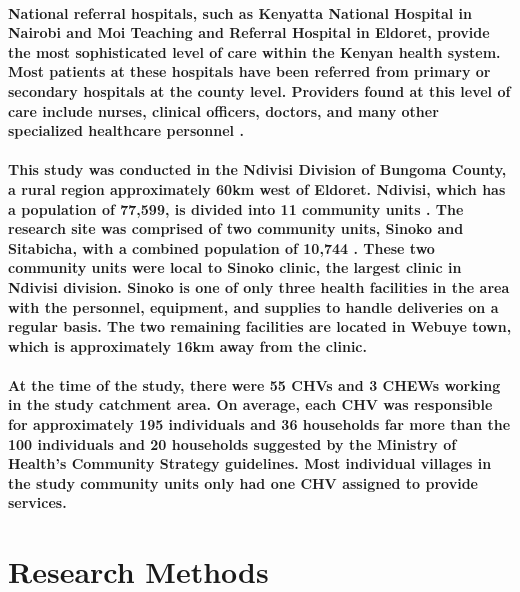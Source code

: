 \paragraph{National referral hospitals, such as Kenyatta National Hospital in Nairobi and Moi Teaching and Referral Hospital in Eldoret, provide the most sophisticated level of care within the Kenyan health system. Most patients at these hospitals have been referred from primary or secondary hospitals at the county level. Providers found at this level of care include nurses, clinical officers, doctors, and many other specialized healthcare personnel \citep{SPA2010}.}

\paragraph{This study was conducted in the Ndivisi Division of Bungoma County, a rural region approximately 60km west of Eldoret. Ndivisi, which has a population of 77,599, is divided into 11 community units \citep{Census2009}. The research site was comprised of two community units, Sinoko and Sitabicha, with a combined population of 10,744 \citep{Census2009}. These two community units were local to Sinoko clinic, the largest clinic in Ndivisi division. Sinoko is one of only three health facilities in the area with the personnel, equipment, and supplies to handle deliveries on a regular basis. The two remaining facilities are located in Webuye town, which is approximately 16km away from the clinic.}

\paragraph{At the time of the study, there were 55 CHVs and 3 CHEWs working in the study catchment area. On average, each CHV was responsible for approximately 195 individuals and 36 households \textemdash   far more than the 100 individuals and 20 households suggested by the Ministry of Health's Community Strategy guidelines. Most individual villages in the study community units only had one CHV assigned to provide services.}


\section{Research Methods}

